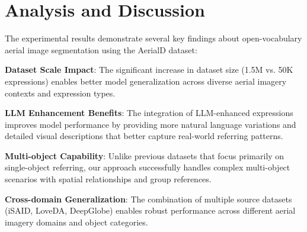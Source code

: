\section{Analysis and Discussion}
The experimental results demonstrate several key findings about open-vocabulary aerial image segmentation using the AerialD dataset:

\textbf{Dataset Scale Impact}: The significant increase in dataset size (1.5M vs. 50K expressions) enables better model generalization across diverse aerial imagery contexts and expression types.

\textbf{LLM Enhancement Benefits}: The integration of LLM-enhanced expressions improves model performance by providing more natural language variations and detailed visual descriptions that better capture real-world referring patterns.

\textbf{Multi-object Capability}: Unlike previous datasets that focus primarily on single-object referring, our approach successfully handles complex multi-object scenarios with spatial relationships and group references.

\textbf{Cross-domain Generalization}: The combination of multiple source datasets (iSAID, LoveDA, DeepGlobe) enables robust performance across different aerial imagery domains and object categories.